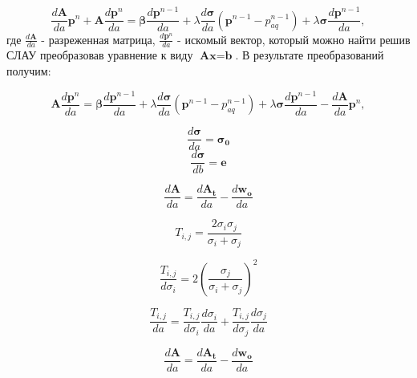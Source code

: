 \documentclass[14pt]{article}
\begin{document}
\begin{equation} \label{rp}
\frac{d\boldsymbol{A}}{da}\boldsymbol{p}^n + \boldsymbol{A}\frac{d\boldsymbol{p}^n}{da} = \boldsymbol{\beta}\frac{d\boldsymbol{p}^{n-1}}{da} + \lambda\frac{d\boldsymbol{\sigma}}{da}(\boldsymbol{p}^{n-1}-p_{aq}^{n-1})+\lambda\boldsymbol{\sigma}\frac{d\boldsymbol{p}^{n-1}}{da},
\end{equation}
где $ \frac{d\boldsymbol{A}}{da} $ - разреженная матрица, $ \frac{d\boldsymbol{p}^n}{da} $ - искомый вектор, который можно найти решив СЛАУ преобразовав уравнение к виду $\textbf{A}\textbf{x}=\textbf{b}$. В результате преобразований получим:

\begin{equation} \label{rp}
\boldsymbol{A}\frac{d\boldsymbol{p}^n}{da} = \boldsymbol{\beta}\frac{d\boldsymbol{p}^{n-1}}{da} + \lambda\frac{d\boldsymbol{\sigma}}{da}(\boldsymbol{p}^{n-1}-p_{aq}^{n-1})+\lambda\boldsymbol{\sigma}\frac{d\boldsymbol{p}^{n-1}}{da}-\frac{d\boldsymbol{A}}{da}\boldsymbol{p}^n,
\end{equation}

\begin{equation*} \label{dsig_da}
\frac{d\boldsymbol{\sigma}}{da} = \boldsymbol{\sigma_0}
\end{equation*}
\begin{equation*} \label{dsig_db}
\frac{d\boldsymbol{\sigma}}{db} = \boldsymbol{e}
\end{equation*}

\begin{equation} \label{dA_da}
\frac{d\boldsymbol{A}}{da} = \frac{d\boldsymbol{A_t}}{da}-\frac{d\boldsymbol{w_o}}{da}
\end{equation}

\begin{equation} \label{Tij}
T_{i,j} = \frac{2{\sigma_i}{\sigma_j}}{{\sigma_i} + {\sigma_j}}
\end{equation}

\begin{equation} \label{dTij_dsigma_i}
\frac{T_{i,j}}{d\sigma_i} = 2\left(\frac{\sigma_j}{{\sigma_i} + {\sigma_j}}\right)^2
\end{equation}

\begin{equation} \label{dTij_da}
\frac{T_{i,j}}{da} = \frac{T_{i,j}}{d\sigma_i}\frac{d\sigma_i}{da} + \frac{T_{i,j}}{d\sigma_j}\frac{d\sigma_j}{da}
\end{equation}


\begin{equation} \label{dT_da}
\frac{d\boldsymbol{A}}{da} = \frac{d\boldsymbol{A_t}}{da}-\frac{d\boldsymbol{w_o}}{da}
\end{equation}
\end{document}
